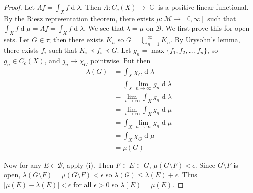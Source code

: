 \documentclass[12pt, a4paper]{book}
\DeclareMathOperator{\C}{\mathbb{C}}
\renewcommand{\d}[1]{\ensuremath{\operatorname{d}\!{#1}}} %
\theoremstyle{nonumberplain}
\newtheorem{proof}{Proof}
\begin{document}
\begin{proof}
    Let $\Lambda f=\int_X f\d{\lambda}$.
    Then $\Lambda:C_c(X)\to\C$ is a positive linear functional.
    By the Riesz representation theorem, there exists $\mu:\mathcal{M}\to[0,\infty]$ such that $\int_Xf\d{\mu}=\Lambda f=\int_Xf\d{\lambda}$.
    We see that $\lambda=\mu$ on $\mathcal{B}$.
    We first prove this for open sets.
    Let $G\in\tau$; then there exists $K_n$ so $G=\bigcup\limits_{n=1}^\infty K_n$.
    By Urysohn's lemma, there exists $f_i$ such that $K_i\prec f_i\prec G$.
    Let $g_n=\max\{f_1,f_2,\ldots,f_n\}$, so $g_n\in C_c(X)$, and $g_n\to\chi_G$ pointwise.
    But then
    \begin{align*}
        \lambda(G) &= \int_X\chi_G\d{\lambda}\\
                   &= \int_X\lim_{n\to\infty}g_n\d{\lambda}\\
                   &= \lim_{n\to\infty}\int_X g_n\d{\lambda}\\
                   &= \lim_{n\to\infty}\int_X g_n\d{\mu}\\
                   &= \int_X\lim_{n\to\infty}g_n\d{\mu}\\
                   &= \int_X\chi_G\d{\mu}\\
                   &=\mu(G)
    \end{align*}

    Now for any $E\in\mathcal{B}$, apply (i).
    Then $F\subset E\subset G$, $\mu(G\setminus F)<\epsilon$.
    Since $G\setminus F$ is open, $\lambda(G\setminus F)=\mu(G\setminus F)<\epsilon$ so $\lambda(G)\leq\lambda(E)+\epsilon$.
    Thus $|\mu(E)-\lambda(E)|<\epsilon$ for all $\epsilon>0$ so $\lambda(E)=\mu(E)$.
\end{proof}
\end{document}
